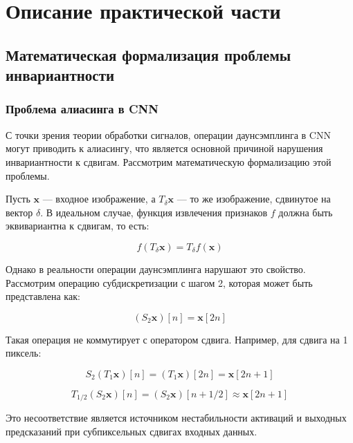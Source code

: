\section{Описание практической части}
\label{sec:Chapter4} 

\subsection{Математическая формализация проблемы инвариантности}
\label{sec:math}

\subsubsection{Проблема алиасинга в CNN}
\label{sec:math:aliasing}

С точки зрения теории обработки сигналов, операции даунсэмплинга в CNN могут приводить к алиасингу, что является основной причиной нарушения инвариантности к сдвигам. Рассмотрим математическую формализацию этой проблемы.

Пусть $\mathbf{x}$ — входное изображение, а $T_{\delta}\mathbf{x}$ — то же изображение, сдвинутое на вектор $\delta$. В идеальном случае, функция извлечения признаков $f$ должна быть эквивариантна к сдвигам, то есть:

\begin{equation}
f(T_{\delta}\mathbf{x}) = T_{\delta}f(\mathbf{x})
\end{equation}

Однако в реальности операции даунсэмплинга нарушают это свойство. Рассмотрим операцию субдискретизации с шагом 2, которая может быть представлена как:

\begin{equation}
(S_2 \mathbf{x})[n] = \mathbf{x}[2n]
\end{equation}

Такая операция не коммутирует с оператором сдвига. Например, для сдвига на 1 пиксель:

\begin{equation}
S_2(T_1 \mathbf{x})[n] = (T_1 \mathbf{x})[2n] = \mathbf{x}[2n+1]
\end{equation}

\begin{equation}
T_{1/2}(S_2 \mathbf{x})[n] = (S_2 \mathbf{x})[n+1/2] \approx \mathbf{x}[2n+1]
\end{equation}

Это несоответствие является источником нестабильности активаций и выходных предсказаний при субпиксельных сдвигах входных данных.

